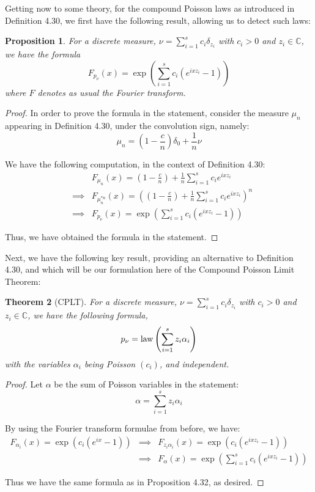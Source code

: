 \documentclass[12pt]{amsbook}
\newtheorem{theorem}{Theorem}[chapter]
\newtheorem{proposition}[theorem]{Proposition}
\begin{document}
\bigskip

Getting now to some theory, for the compound Poisson laws as introduced in Definition 4.30, we first have the following result, allowing us to detect such laws:


\begin{proposition}
For a discrete measure, $\nu=\sum_{i=1}^sc_i\delta_{z_i}$ with $c_i>0$ and $z_i\in\mathbb C$, we have the formula
$$F_{p_\nu}(x)=\exp\left(\sum_{i=1}^sc_i(e^{ixz_i}-1)\right)$$
where $F$ denotes as usual the Fourier transform.
\end{proposition}

\begin{proof}
In order to prove the formula in the statement, consider the measure $\mu_n$ appearing in Definition 4.30, under the convolution sign, namely:
$$\mu_n=\left(1-\frac{c}{n}\right)\delta_0+\frac{1}{n}\nu$$

We have the following computation, in the context of Definition 4.30:
\begin{eqnarray*}
&&F_{\mu_n}(x)=\left(1-\frac{c}{n}\right)+\frac{1}{n}\sum_{i=1}^sc_ie^{ixz_i}\\
&\implies&F_{\mu_n^{*n}}(x)=\left(\left(1-\frac{c}{n}\right)+\frac{1}{n}\sum_{i=1}^sc_ie^{ixz_i}\right)^n\\
&\implies&F_{p_\nu}(x)=\exp\left(\sum_{i=1}^sc_i(e^{ixz_i}-1)\right)
\end{eqnarray*}

Thus, we have obtained the formula in the statement.
\end{proof}

Next, we have the following key result, providing an alternative to Definition 4.30, and which will be our formulation here of the Compound Poisson Limit Theorem:


\begin{theorem}[CPLT]
For a discrete measure, $\nu=\sum_{i=1}^sc_i\delta_{z_i}$ with $c_i>0$ and $z_i\in\mathbb C$, we have the following formula,
$$p_\nu={\rm law}\left(\sum_{i=1}^sz_i\alpha_i\right)$$
with the variables $\alpha_i$ being Poisson $(c_i)$, and independent.
\end{theorem}

\begin{proof}
Let $\alpha$ be the sum of Poisson variables in the statement:
$$\alpha=\sum_{i=1}^sz_i\alpha_i$$

By using the Fourier transform formulae from before, we have:
\begin{eqnarray*}
F_{\alpha_i}(x)=\exp(c_i(e^{ix}-1))
&\implies&F_{z_i\alpha_i}(x)=\exp(c_i(e^{ixz_i}-1))\\
&\implies&F_\alpha(x)=\exp\left(\sum_{i=1}^sc_i(e^{ixz_i}-1)\right)
\end{eqnarray*}

Thus we have the same formula as in Proposition 4.32, as desired.
\end{proof}
\end{document}
